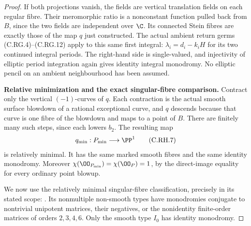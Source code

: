 \begin{proof}
If both projections vanish,
the fields are vertical translation
fields on each regular fibre.
Their meromorphic ratio is a
nonconstant function pulled
back from \(B\), since the two
fields are independent over
\(\C\). Its connected Stein
fibres are exactly those of
the map \(q\) just constructed.
The actual ambient return germs
(C.RG.4)--(C.RG.12) apply to
this same first integral:
\(\lambda_i=d_i-k_iH\) for its
two continued integral periods.
The right-hand side is
single-valued, and injectivity
of elliptic period integration
again gives identity integral
monodromy. No elliptic pencil
on an ambient neighbourhood
has been assumed.

\par\medskip\noindent\textbf{Relative minimization and the exact singular-fibre comparison.}
Contract only the vertical
\((-1)\)-curves of \(q\).
Each contraction is the
actual smooth surface
blowdown of a rational
exceptional curve, and \(q\)
descends because that curve
is one fibre of the blowdown
and maps to a point of \(B\).
There are finitely many such
steps, since each lowers
\(b_2\). The resulting map
\[
               q_{\min}:P_{\min}\longrightarrow\PP^1
 \tag{C.RH.7}
\]
is relatively minimal. It
has the same marked smooth
fibres and the same identity
monodromy. Moreover
\(\chi(\OO_{P_{\min}})=\chi(\OO_P)=1\),
by the direct-image equality
for every ordinary point
blowup.

We now use the relatively
minimal singular-fibre
classification, precisely in
its stated scope:
\cite[Theorem~6.2 and Table~I]{Kodaira1963II}.
Its nonmultiple non-smooth
types have monodromies
conjugate to nontrivial
unipotent matrices, their
negatives, or the nonidentity
finite-order matrices of
orders \(2,3,4,6\).
Only the smooth type \(I_0\)
has identity monodromy.


\end{proof}
